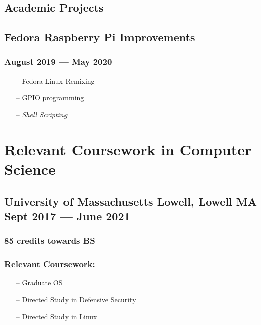 \documentclass[11pt]{article}
\begin{document}
\begin{multicols}{2}
\section{Academic Projects}

\subsection{Fedora Raspberry Pi Improvements}
\subsubsection{August 2019 --- May 2020 }
\begin{itemize}[noitemsep, topsep=0pt]
	\item[--] Fedora Linux Remixing
	\item[--] GPIO programming
	\item[--] \emph{Shell Scripting}
\end{itemize}

\end{multicols}

\section{Relevant Coursework in Computer Science}
\subsection{University of Massachusetts Lowell, Lowell MA\\  Sept 2017 --- June 2021}
\subsubsection{85 credits towards BS}
\subsubsection{Relevant Coursework:}
\begin{itemize}[noitemsep, topsep=0pt]
	\item[--] Graduate OS
	\item[--] Directed Study in Defensive Security
	\item[--] Directed Study in Linux
\end{itemize}
\end{document}
